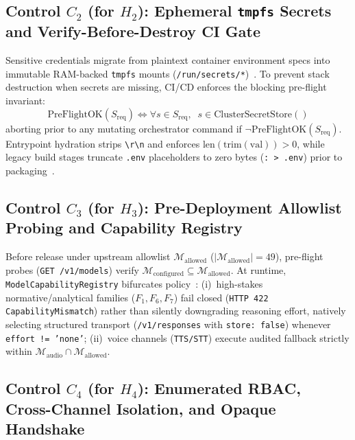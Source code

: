 \documentclass[10pt,twocolumn]{article}
\begin{document}
\subsection{Control $C_2$ (for $H_2$): Ephemeral \texttt{tmpfs} Secrets and Verify-Before-Destroy CI Gate}

Sensitive credentials migrate from plaintext container environment specs into immutable RAM-backed \texttt{tmpfs} mounts (\texttt{/run/secrets/*})~\cite{R18}. To prevent stack destruction when secrets are missing, CI/CD enforces the blocking pre-flight invariant:
\begin{equation}
\mathrm{PreFlightOK}(S_{\mathrm{req}}) \iff \forall s \in S_{\mathrm{req}}, \;\; s \in \mathrm{ClusterSecretStore}()
\end{equation}
aborting prior to any mutating orchestrator command if $\neg \mathrm{PreFlightOK}(S_{\mathrm{req}})$. Entrypoint hydration strips \texttt{\textbackslash r\textbackslash n} and enforces $\mathrm{len}(\mathrm{trim}(\mathrm{val})) > 0$, while legacy build stages truncate \texttt{.env} placeholders to zero bytes (\texttt{: > .env}) prior to packaging~\cite{R15,R21}.

\subsection{Control $C_3$ (for $H_3$): Pre-Deployment Allowlist Probing and Capability Registry}

Before release under upstream allowlist $\mathcal{M}_{\mathrm{allowed}}$ ($|\mathcal{M}_{\mathrm{allowed}}| = 49$), pre-flight probes (\texttt{GET /v1/models}) verify $\mathcal{M}_{\mathrm{configured}} \subseteq \mathcal{M}_{\mathrm{allowed}}$. At runtime, \texttt{ModelCapabilityRegistry} bifurcates policy~\cite{R24,R29}: (i)~high-stakes normative/analytical families ($F_1, F_6, F_7$) fail closed (\texttt{HTTP 422 CapabilityMismatch}) rather than silently downgrading reasoning effort, natively selecting structured transport (\texttt{/v1/responses} with \texttt{store: false}) whenever \texttt{effort != 'none'}; (ii)~voice channels (\texttt{TTS/STT}) execute audited fallback strictly within $\mathcal{M}_{\mathrm{audio}} \cap \mathcal{M}_{\mathrm{allowed}}$.

\subsection{Control $C_4$ (for $H_4$): Enumerated RBAC, Cross-Channel Isolation, and Opaque Handshake}
\end{document}
